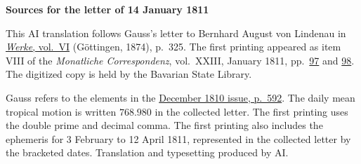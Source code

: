 \clearpage\thispagestyle{empty}
\begin{center}\textbf{Sources for the letter of 14 January 1811}\end{center}
\noindent This AI translation follows Gauss’s letter to Bernhard August von Lindenau in \href{https://gdz.sub.uni-goettingen.de/id/PPN236007467}{\textit{Werke}, vol.~VI} (Göttingen, 1874), p.~325. The first printing appeared as item VIII of the \textit{Monatliche Correspondenz}, vol.~XXIII, January 1811, pp.~\href{https://api.digitale-sammlungen.de/iiif/image/v2/bsb10538612_00105/full/1600,/0/default.jpg}{97} and \href{https://api.digitale-sammlungen.de/iiif/image/v2/bsb10538612_00106/full/1600,/0/default.jpg}{98}. The digitized copy is held by the Bavarian State Library.
\par\smallskip\noindent Gauss refers to the elements in the \href{https://archive.org/download/bub_gb_YCI4AAAAMAAJ/page/n595.jpg}{December 1810 issue, p.~592}. The daily mean tropical motion is written $768.980$ in the collected letter. The first printing uses the double prime and decimal comma. The first printing also includes the ephemeris for 3 February to 12 April 1811, represented in the collected letter by the bracketed dates. Translation and typesetting produced by AI.
\clearpage
